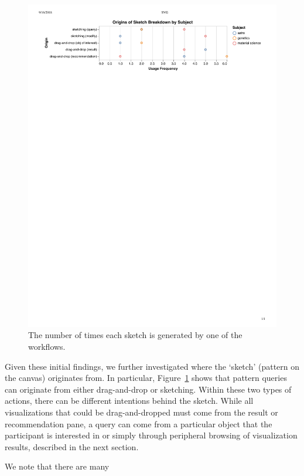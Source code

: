 \begin{figure}[h!]
  \includegraphics[width=\linewidth]{figures/origins_of_sketch_scatter.pdf}
  \caption{The number of times each sketch is generated by one of the workflows.}\label{fig:origins_of_sketch}
\end{figure}
\par Given these initial findings, we further investigated where the `sketch' (pattern on the canvas) originates from. In particular, Figure~\ref{fig:origins_of_sketch} shows that pattern queries can originate from either drag-and-drop or sketching. Within these two types of actions, there can be different intentions behind the sketch. While all visualizations that could be drag-and-dropped must come from the result or recommendation pane, a query can come from a particular object that the participant is interested in or simply through peripheral browsing of visualization results, described in the next section. 
\par We note that there are many %
